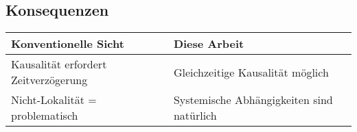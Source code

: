\subsection{Konsequenzen}
\begin{tabular}{p{}p{}}
    \hline
    \textbf{Konventionelle Sicht} & \textbf{Diese Arbeit} \\
    \hline
    Kausalität erfordert Zeitverzögerung & Gleichzeitige Kausalität möglich \\
    Nicht-Lokalität = problematisch & Systemische Abhängigkeiten sind natürlich \\
    \hline
\end{tabular}

